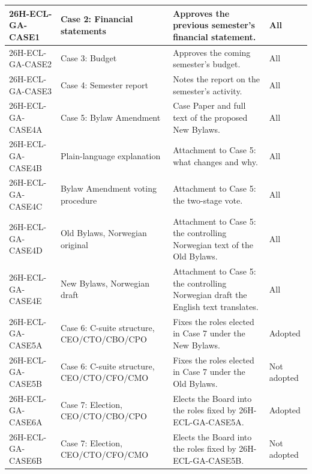 \documentclass{../../../Common/Latex/Templates/rapport}
\begin{document}
\begin{longtable}{|L{3.2cm}|L{3.6cm}|L{5.3cm}|L{1.9cm}|}
  \hline
  26H-ECL-GA-CASE1   & Case 2: Financial statements                    & Approves the previous semester's financial statement.                                         & All \\
  \hline
  26H-ECL-GA-CASE2   & Case 3: Budget                                  & Approves the coming semester's budget.                                                        & All \\
  \hline
  26H-ECL-GA-CASE3   & Case 4: Semester report                         & Notes the report on the semester's activity.                                                  & All \\
  \hline
  26H-ECL-GA-CASE4A  & Case 5: Bylaw Amendment                         & Case Paper and full text of the proposed New Bylaws.                                          & All \\
  \hline
  26H-ECL-GA-CASE4B  & Plain-language explanation                      & Attachment to Case 5: what changes and why.                                                   & All \\
  \hline
  26H-ECL-GA-CASE4C  & Bylaw Amendment voting procedure                & Attachment to Case 5: the two-stage vote.                                                     & All \\
  \hline
  26H-ECL-GA-CASE4D  & Old Bylaws, Norwegian original                  & Attachment to Case 5: the controlling Norwegian text of the Old Bylaws.                        & All \\
  \hline
  26H-ECL-GA-CASE4E  & New Bylaws, Norwegian draft                     & Attachment to Case 5: the controlling Norwegian draft the English text translates.             & All \\
  \hline
  26H-ECL-GA-CASE5A  & Case 6: C-suite structure, CEO/CTO/CBO/CPO      & Fixes the roles elected in Case 7 under the New Bylaws.                                      & Adopted \\
  \hline
  26H-ECL-GA-CASE5B  & Case 6: C-suite structure, CEO/CTO/CFO/CMO      & Fixes the roles elected in Case 7 under the Old Bylaws.                                      & Not adopted \\
  \hline
  26H-ECL-GA-CASE6A  & Case 7: Election, CEO/CTO/CBO/CPO               & Elects the Board into the roles fixed by 26H-ECL-GA-CASE5A.                                  & Adopted \\
  \hline
  26H-ECL-GA-CASE6B  & Case 7: Election, CEO/CTO/CFO/CMO               & Elects the Board into the roles fixed by 26H-ECL-GA-CASE5B.                                  & Not adopted \\

\end{longtable}
\end{document}
